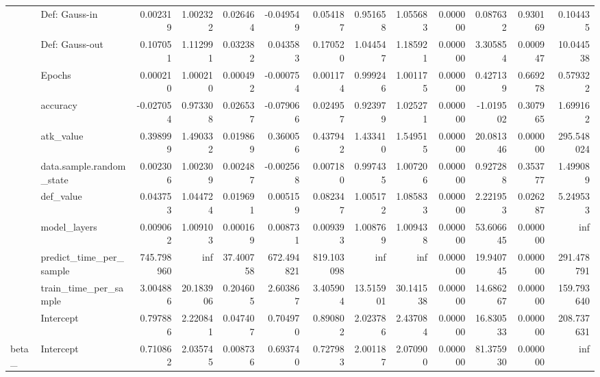 \begin{table}[htbp]
\begin{tabular}{llrrrrrrrrrrr}
 & Def: Gauss-in & 0.002319 & 1.002322 & 0.026464 & -0.049549 & 0.054187 & 0.951658 & 1.055683 & 0.000000 & 0.087632 & 0.930169 & 0.104435 \\
 & Def: Gauss-out & 0.107051 & 1.112991 & 0.032382 & 0.043583 & 0.170520 & 1.044547 & 1.185921 & 0.000000 & 3.305854 & 0.000947 & 10.044538 \\
 & Epochs & 0.000210 & 1.000210 & 0.000492 & -0.000754 & 0.001174 & 0.999246 & 1.001175 & 0.000000 & 0.427139 & 0.669278 & 0.579322 \\
 & accuracy & -0.027054 & 0.973308 & 0.026537 & -0.079066 & 0.024957 & 0.923979 & 1.025271 & 0.000000 & -1.019502 & 0.307965 & 1.699162 \\
 & atk\_value & 0.398999 & 1.490332 & 0.019869 & 0.360056 & 0.437942 & 1.433410 & 1.549515 & 0.000000 & 20.081346 & 0.000000 & 295.548024 \\
 & data.sample.random\_state & 0.002306 & 1.002309 & 0.002487 & -0.002568 & 0.007180 & 0.997435 & 1.007206 & 0.000000 & 0.927288 & 0.353777 & 1.499089 \\
 & def\_value & 0.043753 & 1.044724 & 0.019691 & 0.005159 & 0.082347 & 1.005172 & 1.085833 & 0.000000 & 2.221953 & 0.026287 & 5.249533 \\
 & model\_layers & 0.009062 & 1.009103 & 0.000169 & 0.008731 & 0.009393 & 1.008769 & 1.009438 & 0.000000 & 53.606645 & 0.000000 & inf \\
 & predict\_time\_per\_sample & 745.798960 & inf & 37.400758 & 672.494821 & 819.103098 & inf & inf & 0.000000 & 19.940745 & 0.000000 & 291.478791 \\
 & train\_time\_per\_sample & 3.004886 & 20.183906 & 0.204605 & 2.603867 & 3.405904 & 13.515901 & 30.141538 & 0.000000 & 14.686267 & 0.000000 & 159.793640 \\
 & Intercept & 0.797886 & 2.220841 & 0.047407 & 0.704970 & 0.890802 & 2.023786 & 2.437084 & 0.000000 & 16.830533 & 0.000000 & 208.737631 \\
\cline{1-13}
beta\_ & Intercept & 0.710862 & 2.035745 & 0.008736 & 0.693740 & 0.727983 & 2.001187 & 2.070900 & 0.000000 & 81.375930 & 0.000000 & inf \\
\cline{1-13}
\bottomrule
\end{tabular}
\end{table}
